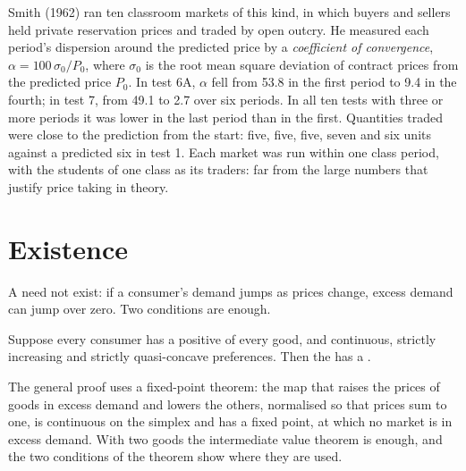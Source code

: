 \begin{record}
Smith (1962) ran ten classroom markets of this kind, in which buyers and sellers held private
reservation prices and traded by open outcry. He measured each period's dispersion around the predicted
price by a \emph{coefficient of convergence}, $\alpha = 100\,\sigma_0/P_0$, where $\sigma_0$ is the
root mean square deviation of contract prices from the predicted price $P_0$. In test 6A, $\alpha$ fell
from 53.8 in the first period to 9.4 in the fourth; in test 7, from 49.1 to 2.7 over six periods. In all
ten tests with three or more periods it was lower in the last period than in the first. Quantities
traded were close to the prediction from the start: five, five, five, seven and six units against a
predicted six in test 1. Each market was run within one class period, with the students of one class
as its traders: far from the large numbers that justify price taking in theory.
\end{record}

\section{Existence}\label{sec:b2:exchange-economies:existence}

A  need not exist: if a consumer's demand jumps as prices change, excess demand
can jump over zero. Two conditions are enough.

\begin{theorem}\label{thm:b2:exchange-economies:existence}
Suppose every consumer has a positive  of every good, and continuous, strictly increasing and
strictly quasi-concave preferences. Then the  has a .
\end{theorem}

\admitted

The general proof uses a fixed-point theorem: the map that raises the prices of goods in excess demand
and lowers the others, normalised so that prices sum to one, is continuous on the simplex and has a
fixed point, at which no market is in excess demand. With two goods the intermediate value theorem is
enough, and the two conditions of the theorem show where they are used.

